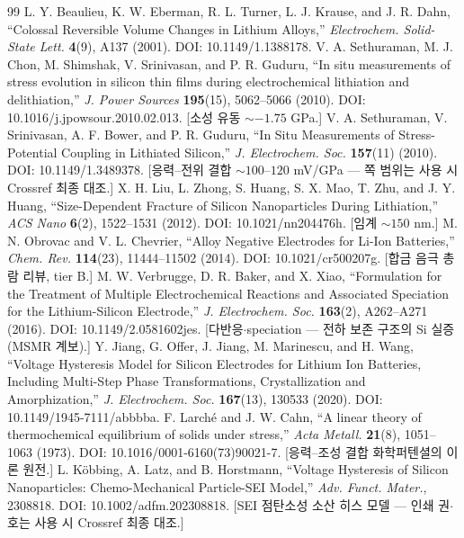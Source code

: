 \begin{thebibliography}{99}
 L. Y. Beaulieu, K. W. Eberman, R. L. Turner, L. J. Krause, and J. R. Dahn, ``Colossal Reversible Volume Changes in Lithium Alloys,'' \emph{Electrochem. Solid-State Lett.} \textbf{4}(9), A137 (2001). DOI: 10.1149/1.1388178.
 V. A. Sethuraman, M. J. Chon, M. Shimshak, V. Srinivasan, and P. R. Guduru, ``In situ measurements of stress evolution in silicon thin films during electrochemical lithiation and delithiation,'' \emph{J. Power Sources} \textbf{195}(15), 5062--5066 (2010). DOI: 10.1016/j.jpowsour.2010.02.013. [소성 유동 $\sim-1.75$ GPa.]
 V. A. Sethuraman, V. Srinivasan, A. F. Bower, and P. R. Guduru, ``In Situ Measurements of Stress-Potential Coupling in Lithiated Silicon,'' \emph{J. Electrochem. Soc.} \textbf{157}(11) (2010). DOI: 10.1149/1.3489378. [응력--전위 결합 $\sim100$--$120$ mV/GPa --- 쪽 범위는 사용 시 Crossref 최종 대조.]
 X. H. Liu, L. Zhong, S. Huang, S. X. Mao, T. Zhu, and J. Y. Huang, ``Size-Dependent Fracture of Silicon Nanoparticles During Lithiation,'' \emph{ACS Nano} \textbf{6}(2), 1522--1531 (2012). DOI: 10.1021/nn204476h. [임계 $\sim150$ nm.]
 M. N. Obrovac and V. L. Chevrier, ``Alloy Negative Electrodes for Li-Ion Batteries,'' \emph{Chem. Rev.} \textbf{114}(23), 11444--11502 (2014). DOI: 10.1021/cr500207g. [합금 음극 총람 리뷰, tier B.]
 M. W. Verbrugge, D. R. Baker, and X. Xiao, ``Formulation for the Treatment of Multiple Electrochemical Reactions and Associated Speciation for the Lithium-Silicon Electrode,'' \emph{J. Electrochem. Soc.} \textbf{163}(2), A262--A271 (2016). DOI: 10.1149/2.0581602jes. [다반응$\cdot$speciation --- 전하 보존 구조의 Si 실증(MSMR 계보).]
 Y. Jiang, G. Offer, J. Jiang, M. Marinescu, and H. Wang, ``Voltage Hysteresis Model for Silicon Electrodes for Lithium Ion Batteries, Including Multi-Step Phase Transformations, Crystallization and Amorphization,'' \emph{J. Electrochem. Soc.} \textbf{167}(13), 130533 (2020). DOI: 10.1149/1945-7111/abbbba.
 F. Larch\'e and J. W. Cahn, ``A linear theory of thermochemical equilibrium of solids under stress,'' \emph{Acta Metall.} \textbf{21}(8), 1051--1063 (1973). DOI: 10.1016/0001-6160(73)90021-7. [응력--조성 결합 화학퍼텐셜의 이론 원전.]
 L. K\"obbing, A. Latz, and B. Horstmann, ``Voltage Hysteresis of Silicon Nanoparticles: Chemo-Mechanical Particle-SEI Model,'' \emph{Adv. Funct. Mater.}, 2308818. DOI: 10.1002/adfm.202308818. [SEI 점탄소성 소산 히스 모델 --- 인쇄 권$\cdot$호는 사용 시 Crossref 최종 대조.]
\end{thebibliography}

